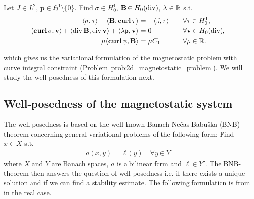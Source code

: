 \documentclass[../master_thesis.tex]{subfiles}
\begin{document}
\begin{problem}\label{prob:magnetostatic_problem_variational}
    Let $J \in L^2$, $\mathbf{p} \in \mathfrak{H}^1 \setminus \{0\}$. 
    Find $\sigma \in H^1_0$, $\mathbf{B} \in H_0(\operatorname{div})$, $\lambda \in \mathbb{R}$ s.t.
    \begin{align}
        \langle \sigma, \tau \rangle - \langle \mathbf{B}, \veccurl\tau \rangle 
        &=  -\langle J, \tau \rangle &&\quad \forall \tau \in H^1_0, \label{eq:first_eq_mixed_formulation_curve_integral}
        \\ \langle \veccurl\sigma, \mathbf{v} \rangle + \langle \diver \mathbf{B}, \diver \mathbf{v} \rangle 
        + \langle \lambda \mathbf{p}, \mathbf{v} \rangle 
        &= 0 &&\quad \forall \mathbf{v} \in H_0(\diver), \label{eq:second_eq_mixed_formulation_curve_integral}
        \\ \mu \langle \bm{\curl} \psi, \mathbf{B} \rangle &= \mu C_1 &&\quad \forall \mu \in \real.
    \end{align}
\end{problem}
\noindent which gives us the variational formulation of the magnetostatic problem with curve integral 
constraint (Problem\,\ref{prob:2d_magnetostatic_problem}). 
We will study the well-posedness of this formulation next. 

\subsection{Well-posedness of the magnetostatic system}\label{sec:well-posedness_of_magnetostatic_system}

The well-posedness is based on the well-known Banach-Nečas-Babuška (BNB) theorem 
concerning general variational problems of the following form: Find $x \in X$ 
s.t. 
\begin{align}
    a(x,y) = \ell(y) \quad \forall y \in Y \label{eq:general_variational_problem}
\end{align}
where $X$ and $Y$ are Banach spaces, $a$ is a bilinear form 
and $\ell \in Y'$. The BNB-theorem then answers the question of well-posedness 
i.e. if there exists a unique solution and if we can find a stability estimate.
The following formulation is from \cite[Sec.\,25.3]{ern_guermond_2} in the real case.
\end{document}
